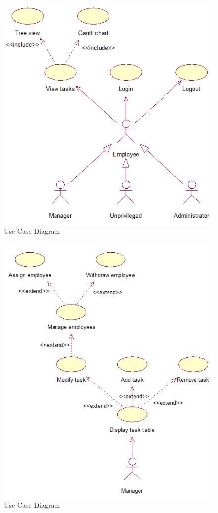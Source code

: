 \documentclass[12pt]{article}
\begin{document}
\begin{figure}[htbp]
\begin{center} \includegraphics[scale=1]{diagrams/usecase1_2b.png} \end{center}
\caption{Use Case Diagram}
\label{fig:use-case-diagram}
\end{figure}
\begin{figure}[htbp]
\begin{center} \includegraphics[scale=1]{diagrams/usecase1_2a.png} \end{center}
\caption{Use Case Diagram}
\label{fig:use-case-diagram}
\end{figure}
\end{document}
